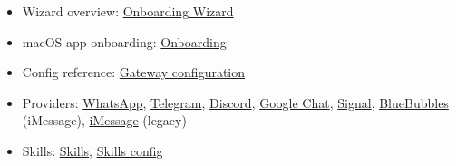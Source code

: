\begin{itemize}
  \item Wizard overview: \href{/start/wizard}{Onboarding Wizard}
  \item macOS app onboarding: \href{/start/onboarding}{Onboarding}
  \item Config reference: \href{/gateway/configuration}{Gateway configuration}
  \item Providers: \href{/channels/whatsapp}{WhatsApp}, \href{/channels/telegram}{Telegram}, \href{/channels/discord}{Discord}, \href{/channels/googlechat}{Google Chat}, \href{/channels/signal}{Signal}, \href{/channels/bluebubbles}{BlueBubbles} (iMessage), \href{/channels/imessage}{iMessage} (legacy)
  \item Skills: \href{/tools/skills}{Skills}, \href{/tools/skills-config}{Skills config}
\end{itemize}



\clearpage
